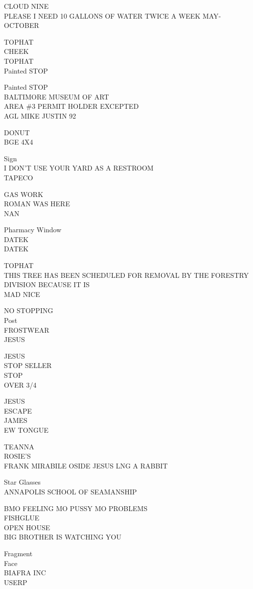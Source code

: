 \documentclass[10pt,letterpaper]{article}
\begin{document}
CLOUD NINE\\
PLEASE I NEED 10 GALLONS OF WATER TWICE A WEEK MAY{-}OCTOBER

TOPHAT\\
CHEEK\\
TOPHAT\\
Painted STOP

Painted STOP\\
BALTIMORE MUSEUM OF ART\\
AREA \#3 PERMIT HOLDER EXCEPTED\\
AGL MIKE JUSTIN 92

DONUT\\
BGE 4X4

Sign\\
I DON'T USE YOUR YARD AS A RESTROOM\\
TAPECO

GAS WORK\\
ROMAN WAS HERE\\
NAN

Pharmacy Window\\
DATEK\\
DATEK

TOPHAT\\
THIS TREE HAS BEEN SCHEDULED FOR REMOVAL BY THE FORESTRY DIVISION BECAUSE IT IS\\
MAD NICE

NO STOPPING\\
Post\\
FROSTWEAR\\
JESUS

JESUS\\
STOP SELLER\\
STOP\\
OVER 3/4

JESUS\\
ESCAPE\\
JAMES\\
EW TONGUE

TEANNA\\
ROSIE'S\\
FRANK MIRABILE OSIDE JESUS LNG A RABBIT

Star Glasses\\
ANNAPOLIS SCHOOL OF SEAMANSHIP

BMO FEELING MO PUSSY MO PROBLEMS\\
FISHGLUE\\
OPEN HOUSE\\
BIG BROTHER IS WATCHING YOU

Fragment\\
Face\\
BIAFRA INC\\
USERP
\end{document}
